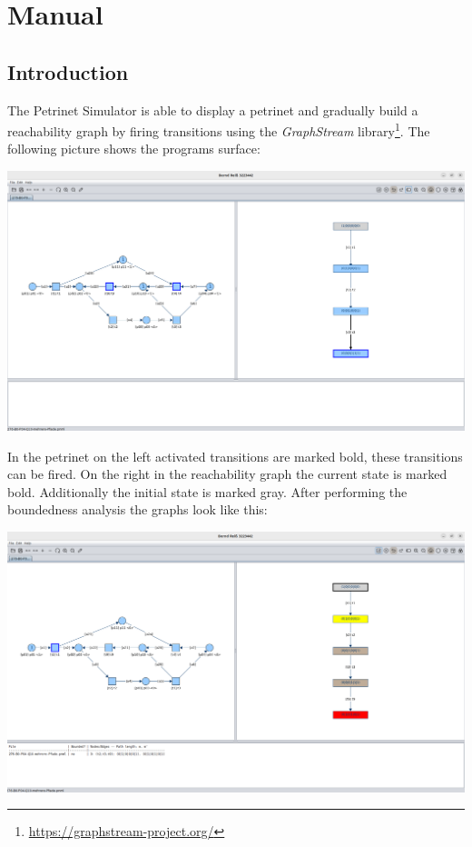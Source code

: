 \documentclass[10pt, a4paper]{article}
\begin{document}
 

\thispagestyle{empty}
\newpage 

\tableofcontents \thispagestyle{plain} \newpage


 \rmfamily \onehalfspace 

\section{Manual}

\subsection{Introduction}
\label{label:introduction}
The Petrinet Simulator is able to display a petrinet and gradually build a reachability graph by firing transitions using the \textit{GraphStream} library\footnote{\url{https://graphstream-project.org/}}. The following picture shows the programs surface:

\begin{center}
\includegraphics[width=\textwidth]{Pictures/Example_276.png}
\end{center}

In the petrinet on the left activated transitions are marked bold, these transitions can be fired. On the right in the reachability graph the current state is marked bold. Additionally the initial state is marked gray. After performing the boundedness analysis the graphs look like this: 

\begin{center}
\includegraphics[width=\textwidth]{Pictures/Example_276_analysed.png}
\end{center}
\end{document}
